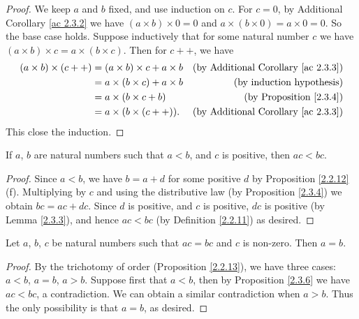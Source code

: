 \begin{proof}
    We keep \(a\) and \(b\) fixed, and use induction on \(c\).
    For \(c = 0\), by Additional Corollary \ref{ac 2.3.2} we have \((a \times b) \times 0 = 0\) and \(a \times (b \times 0) = a \times 0 = 0\).
    So the base case holds.
    Suppose inductively that for some natural number \(c\) we have \((a \times b) \times c = a \times (b \times c)\).
    Then for \(c++\), we have
    \begin{align*}
        (a \times b) \times (c++) & = (a \times b) \times c + a \times b & \text{(by Additional Corollary \ref{ac 2.3.3})} \\
                                  & = a \times (b \times c) + a \times b & \text{(by induction hypothesis)}                \\
                                  & = a \times (b \times c + b)          & \text{(by Proposition \ref{2.3.4})}             \\
                                  & = a \times (b \times (c++)).         & \text{(by Additional Corollary \ref{ac 2.3.3})}
    \end{align*}
    This close the induction.
\end{proof}

\begin{proposition}\label{2.3.6}
    If \(a\), \(b\) are natural numbers such that \(a < b\), and \(c\) is positive, then \(ac < bc\).
\end{proposition}

\begin{proof}
    Since \(a < b\), we have \(b = a + d\) for some positive \(d\) by Proposition \ref{2.2.12}(f).
    Multiplying by \(c\) and using the distributive law (by Proposition \ref{2.3.4}) we obtain \(bc = ac + dc\).
    Since \(d\) is positive, and \(c\) is positive, \(dc\) is positive (by Lemma \ref{2.3.3}), and hence \(ac < bc\) (by Definition \ref{2.2.11}) as desired.
\end{proof}

\begin{corollary}\label{2.3.7}
    Let \(a\), \(b\), \(c\) be natural numbers such that \(ac = bc\) and \(c\) is non-zero.
    Then \(a = b\).
\end{corollary}

\begin{proof}
    By the trichotomy of order (Proposition \ref{2.2.13}), we have three cases: \(a < b\), \(a = b\), \(a > b\).
    Suppose first that \(a < b\), then by Proposition \ref{2.3.6} we have \(ac < bc\), a contradiction.
    We can obtain a similar contradiction when \(a > b\).
    Thus the only possibility is that \(a = b\), as desired.
\end{proof}

